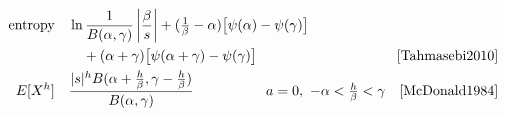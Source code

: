 \begin{table*}[p]
\begin{align*}
\\
\text{entropy} \quad  &   \ln \frac{1}{B(\alpha, \gamma)} \left|\frac{\beta}{s}\right|
  +(\tfrac{1}{\beta}-\alpha) \big[ \psi(\alpha) - \psi(\gamma)\big]
  \hspace{-7em} 
  \\
& \quad +(\alpha+\gamma) \big[ \psi(\alpha+\gamma) - \psi(\gamma)\big] \checked & \text{\cite[Eq.~(15)]{Tahmasebi2010}}
\\
E[ X^h]  \quad & \frac{|s|^h B(\alpha+\tfrac{h}{\beta},\gamma- \tfrac{h}{\beta}) }{B(\alpha,\gamma)} 
& \!\!a=0,\  -\alpha< \tfrac{h}{\beta} <\gamma \quad   \text{\cite{McDonald1984}} \checked
\end{align*}
\end{table*}



